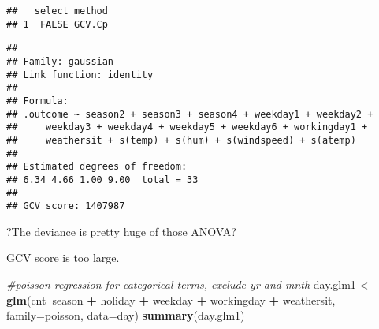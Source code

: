 \documentclass[]{article}
\newenvironment{Shaded}{\begin{snugshade}}{\end{snugshade}}
\newcommand{\KeywordTok}[1]{\textcolor[rgb]{0.13,0.29,0.53}{\textbf{#1}}}
\newcommand{\DataTypeTok}[1]{\textcolor[rgb]{0.13,0.29,0.53}{#1}}
\newcommand{\DecValTok}[1]{\textcolor[rgb]{0.00,0.00,0.81}{#1}}
\newcommand{\StringTok}[1]{\textcolor[rgb]{0.31,0.60,0.02}{#1}}
\newcommand{\CommentTok}[1]{\textcolor[rgb]{0.56,0.35,0.01}{\textit{#1}}}
\newcommand{\OtherTok}[1]{\textcolor[rgb]{0.56,0.35,0.01}{#1}}
\newcommand{\OperatorTok}[1]{\textcolor[rgb]{0.81,0.36,0.00}{\textbf{#1}}}
\newcommand{\NormalTok}[1]{#1}
\begin{document}
\begin{Shaded}
\end{Shaded}

\begin{verbatim}
##   select method
## 1  FALSE GCV.Cp
\end{verbatim}

\begin{Shaded}
\end{Shaded}

\begin{verbatim}
## 
## Family: gaussian 
## Link function: identity 
## 
## Formula:
## .outcome ~ season2 + season3 + season4 + weekday1 + weekday2 + 
##     weekday3 + weekday4 + weekday5 + weekday6 + workingday1 + 
##     weathersit + s(temp) + s(hum) + s(windspeed) + s(atemp)
## 
## Estimated degrees of freedom:
## 6.34 4.66 1.00 9.00  total = 33 
## 
## GCV score: 1407987
\end{verbatim}

?The deviance is pretty huge of those ANOVA?

GCV score is too large.

\begin{Shaded}
\begin{Highlighting}[]
\CommentTok{#poisson regression for categorical terms, exclude yr and mnth}
\NormalTok{day.glm1 <-}\StringTok{ }\KeywordTok{glm}\NormalTok{(cnt}\OperatorTok{~}\NormalTok{season }\OperatorTok{+}\StringTok{ }\NormalTok{holiday }\OperatorTok{+}\StringTok{ }\NormalTok{weekday }\OperatorTok{+}\StringTok{ }\NormalTok{workingday }\OperatorTok{+}\StringTok{ }\NormalTok{weathersit, }\DataTypeTok{family=}\NormalTok{poisson, }\DataTypeTok{data=}\NormalTok{day)}
\KeywordTok{summary}\NormalTok{(day.glm1)}
\end{Highlighting}
\end{Shaded}
\end{document}
